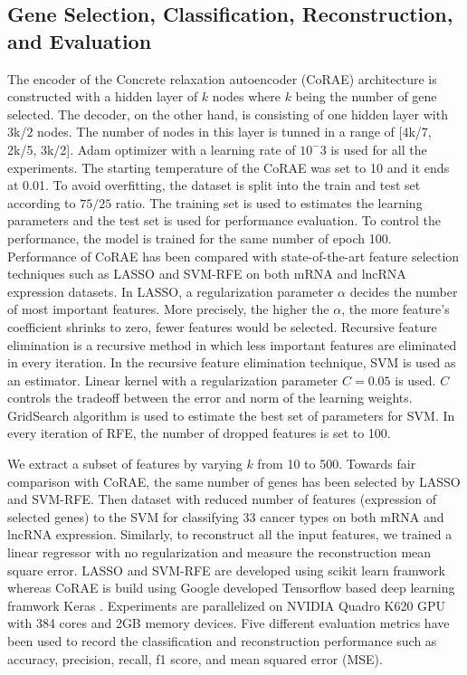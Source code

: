\documentclass{bioinfo}
\begin{document}
\subsection{Gene Selection, Classification, Reconstruction, and Evaluation} \label{method-details}
The encoder of the Concrete relaxation autoencoder (CoRAE) architecture is constructed with a hidden layer of $k$ nodes where $k$ being the number of gene selected. The decoder, on the other hand, is consisting of one hidden layer with 3k/2 nodes. The number of nodes in this layer is tunned in a range of [4k/7, 2k/5, 3k/2]. Adam optimizer with a learning rate of $10^-3$ is used for all the experiments. The starting temperature of the CoRAE was set to 10 and it ends at 0.01. To avoid overfitting, the dataset is split into the train and test set according to $75/25$ ratio. The training set is used to estimates the learning parameters and the test set is used for performance evaluation. To control the performance, the model is trained for the same number of epoch 100. 
Performance of CoRAE has been compared with state-of-the-art feature selection techniques such as LASSO and SVM-RFE on both mRNA and lncRNA expression datasets. In LASSO, a regularization parameter $\alpha$ decides the number of most important features. More precisely, the higher the $\alpha$, the more feature's coefficient shrinks to zero, fewer features would be selected. Recursive feature elimination is a recursive method in which less important features are eliminated in every iteration. In the recursive feature elimination technique, SVM is used as an estimator. Linear kernel with 
a regularization parameter $C=0.05$ is used. $C$ controls the tradeoff between the error and norm of the learning weights. GridSearch algorithm is used to estimate the best set of parameters for SVM. In every iteration of RFE, the number of dropped features is set to 100. 

We extract a subset of features by varying $k$ from 10 to 500. Towards fair comparison with CoRAE, the same number of genes has been selected by LASSO and SVM-RFE. Then dataset with reduced number of features (expression of selected genes) to the SVM for classifying 33 cancer types on both mRNA and lncRNA expression. Similarly, to reconstruct all the input features, we trained a linear regressor with no regularization and measure the reconstruction mean square error. 
LASSO and SVM-RFE are developed using scikit learn framwork \citep{scikit-learn} whereas CoRAE is build using Google developed Tensorflow \citep{tensorflow2015-whitepaper} based deep learning framwork Keras \citep{chollet2015keras}. Experiments are parallelized on NVIDIA Quadro K620 GPU with 384 cores and 2GB memory devices. Five different evaluation metrics have been used to record the classification and reconstruction performance such as accuracy, precision, recall, f1 score, and mean squared error (MSE). 
\end{document}
